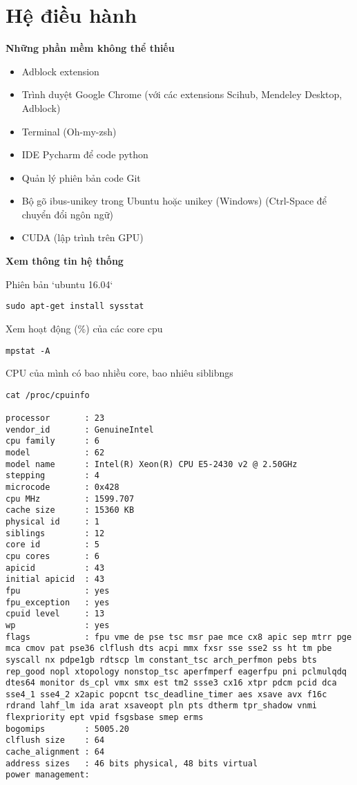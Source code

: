 \chapter{Hệ điều hành}

\textbf{Những phần mềm không thể thiếu}

\begin{itemize}
  \item Adblock extension
  \item Trình duyệt Google Chrome (với các extensions Scihub, Mendeley Desktop, Adblock)
  \item Terminal (Oh-my-zsh)
  \item IDE Pycharm để code python
  \item Quản lý phiên bản code Git
  \item Bộ gõ ibus-unikey trong Ubuntu hoặc unikey (Windows) (Ctrl-Space để chuyển đổi ngôn ngữ)
  \item CUDA (lập trình trên GPU)
\end{itemize}

\textbf{Xem thông tin hệ thống}

Phiên bản `ubuntu 16.04`

\begin{lstlisting}
sudo apt-get install sysstat
\end{lstlisting}


Xem hoạt động (\%) của các core cpu

\begin{lstlisting}
mpstat -A
\end{lstlisting}


CPU của mình có bao nhiều core, bao nhiêu siblibngs

\begin{lstlisting}
cat /proc/cpuinfo

processor       : 23
vendor_id       : GenuineIntel
cpu family      : 6
model           : 62
model name      : Intel(R) Xeon(R) CPU E5-2430 v2 @ 2.50GHz
stepping        : 4
microcode       : 0x428
cpu MHz         : 1599.707
cache size      : 15360 KB
physical id     : 1
siblings        : 12
core id         : 5
cpu cores       : 6
apicid          : 43
initial apicid  : 43
fpu             : yes
fpu_exception   : yes
cpuid level     : 13
wp              : yes
flags           : fpu vme de pse tsc msr pae mce cx8 apic sep mtrr pge mca cmov pat pse36 clflush dts acpi mmx fxsr sse sse2 ss ht tm pbe syscall nx pdpe1gb rdtscp lm constant_tsc arch_perfmon pebs bts rep_good nopl xtopology nonstop_tsc aperfmperf eagerfpu pni pclmulqdq dtes64 monitor ds_cpl vmx smx est tm2 ssse3 cx16 xtpr pdcm pcid dca sse4_1 sse4_2 x2apic popcnt tsc_deadline_timer aes xsave avx f16c rdrand lahf_lm ida arat xsaveopt pln pts dtherm tpr_shadow vnmi flexpriority ept vpid fsgsbase smep erms
bogomips        : 5005.20
clflush size    : 64
cache_alignment : 64
address sizes   : 46 bits physical, 48 bits virtual
power management:
\end{lstlisting}

